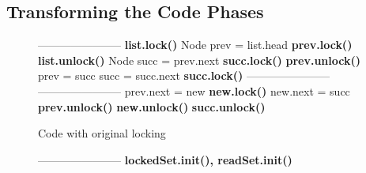 \subsection{Transforming the Code Phases}\label{ssec:transformation}

\newcommand{\spOne}{\hspace{-3mm}\ }
\newcommand{\spZero}{\hspace{-3mm}}
\begin{figure*}
\codesize
	\begin{center}
	\begin{subfigure}[b]{.47\textwidth}
		\begin{algorithmic}[1]{}
		{\ttfamily
			 \label{code:begin}
			\Statex -----------------------
			\State                               \label{code:beginRead}
            \State{\spOne}\textbf{list.lock()}
			\State{\spOne}Node prev = list.head
			\State{\spOne}\textbf{prev.lock()}
            \State{\spOne}\textbf{list.unlock()}
			\State{\spOne}Node succ = prev.next
			\State{\spOne}\textbf{succ.lock()}
			\State{\spOne}\textbf{prev.unlock()}
			\State{\spZero}prev = succ
			\State{\spZero}succ = succ.next
			\State{\spZero}\textbf{succ.lock()}  \label{code:endRead}
			\Statex -----------------------
			\State                               \label{code:beginValidation}
			\State
			\State
			\State
			\State
			\State
			\State
            \State                               \label{code:endValidation}
			\Statex -----------------------
			\State{\spZero}prev.next = new       \label{code:beginUpdate}
			\State{\spZero}\textbf{new.lock()}
			\State{\spZero}new.next = succ
            \State
			\State{\spZero}\textbf{prev.unlock()}
            \State
			\State{\spZero}\textbf{new.unlock()}
            \State
			\State{\spZero}\textbf{succ.unlock()}  \label{code:endUpdate}
			\EndFunction
			}
		\end{algorithmic}
		\caption{Code with original locking} \label{figure:transformation:before}
	\end{subfigure}
\hspace{0.03\textwidth}
	\begin{subfigure}[b]{.47\textwidth}
		\begin{algorithmic}[1]{}
		{\ttfamily
			 \label{code:begin}
			\Statex -----------------------
			\Comment{\textrm{read-only phase}}
            \State{\spOne}\textbf{lockedSet.init(), readSet.init()} \label{code:initSets}
}
\end{algorithmic}
\end{subfigure}
\end{center}
\end{figure*}
